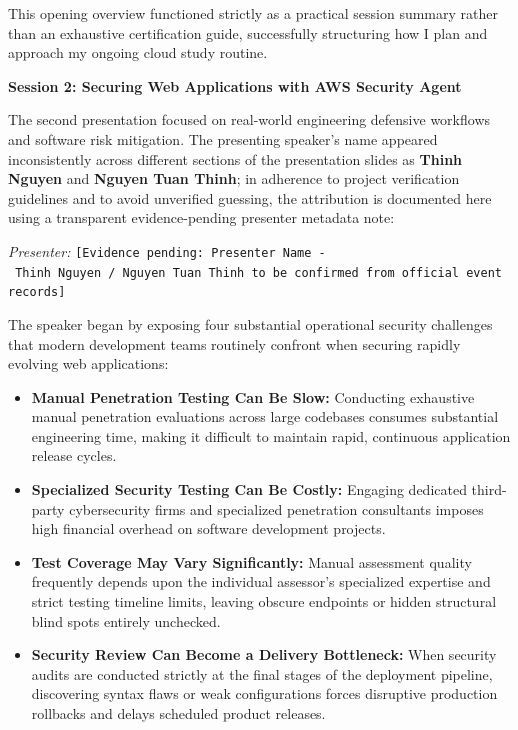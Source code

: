 This opening overview functioned strictly as a practical session summary
rather than an exhaustive certification guide, successfully structuring
how I plan and approach my ongoing cloud study routine.

\vspace{0.5em}\noindent\textbf{Session 2: Securing Web Applications with AWS Security
Agent}\par

The second presentation focused on real-world engineering defensive
workflows and software risk mitigation. The presenting speaker's name
appeared inconsistently across different sections of the presentation
slides as \textbf{Thinh Nguyen} and \textbf{Nguyen Tuan Thinh}; in
adherence to project verification guidelines and to avoid unverified
guessing, the attribution is documented here using a transparent
evidence-pending presenter metadata note:

\emph{Presenter:}
\texttt{{[}Evidence\ pending:\ Presenter\ Name\ -\ Thinh\ Nguyen\ /\ Nguyen\ Tuan\ Thinh\ to\ be\ confirmed\ from\ official\ event\ records{]}}

The speaker began by exposing four substantial operational security
challenges that modern development teams routinely confront when
securing rapidly evolving web applications:

\begin{itemize}
\tightlist
\item
  \textbf{Manual Penetration Testing Can Be Slow:} Conducting exhaustive
  manual penetration evaluations across large codebases consumes
  substantial engineering time, making it difficult to maintain rapid,
  continuous application release cycles.
\item
  \textbf{Specialized Security Testing Can Be Costly:} Engaging
  dedicated third-party cybersecurity firms and specialized penetration
  consultants imposes high financial overhead on software development
  projects.
\item
  \textbf{Test Coverage May Vary Significantly:} Manual assessment
  quality frequently depends upon the individual assessor's specialized
  expertise and strict testing timeline limits, leaving obscure
  endpoints or hidden structural blind spots entirely unchecked.
\item
  \textbf{Security Review Can Become a Delivery Bottleneck:} When
  security audits are conducted strictly at the final stages of the
  deployment pipeline, discovering syntax flaws or weak configurations
  forces disruptive production rollbacks and delays scheduled product
  releases.
\end{itemize}

